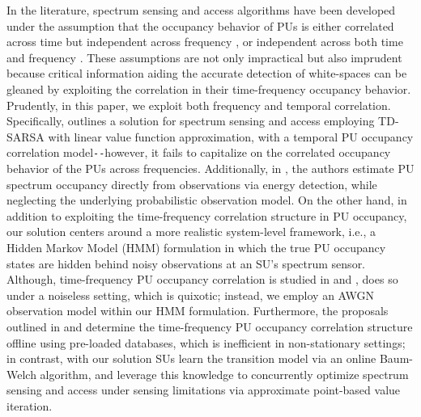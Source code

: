 \documentclass[10pt, twocolumn]{IEEEtran}
\begin{document}
 In the literature, spectrum sensing and access algorithms have been developed under the assumption that the occupancy behavior of PUs is either correlated across time but independent across frequency \cite{WCL:5, WCL:6}, or independent across both time and frequency \cite{WCL:4, WCL:9, WCL:10, WCL:8, WCL:3, WCL:11, WCL:MIT}.
These assumptions are not only impractical but also imprudent because critical information aiding the accurate detection of white-spaces can be gleaned by exploiting the correlation in their time-frequency occupancy behavior. Prudently, in this paper, we exploit both frequency and temporal correlation. Specifically, \cite{WCL:5} outlines a solution for spectrum sensing and access employing TD-SARSA with linear value function approximation, with a temporal PU occupancy correlation model\texttt{-{}-}however, it fails to capitalize on the correlated occupancy behavior of the PUs across frequencies. Additionally, in \cite{WCL:5}, the authors estimate PU spectrum occupancy directly from observations via energy detection, while neglecting the underlying probabilistic observation model. On the other hand, in addition to exploiting the time-frequency correlation structure in PU occupancy, our solution centers around a more realistic system-level framework, i.e., a Hidden Markov Model (HMM) formulation in which the true PU occupancy states are hidden behind noisy observations at an SU's spectrum sensor. Although, time-frequency PU occupancy correlation is studied in \cite{WCL:6} and \cite{WCL:7}, \cite{WCL:7} does so under a noiseless setting, which is quixotic; instead, we employ an AWGN observation model within our HMM formulation. Furthermore, the proposals outlined in \cite{WCL:6} and \cite{WCL:7} determine the time-frequency PU occupancy correlation structure offline using pre-loaded databases, which is inefficient in non-stationary settings;
in contrast, with our solution  SUs learn the transition model via an online Baum-Welch algorithm, and leverage this knowledge to concurrently optimize spectrum sensing and access under sensing limitations via approximate point-based value iteration.
\end{document}
